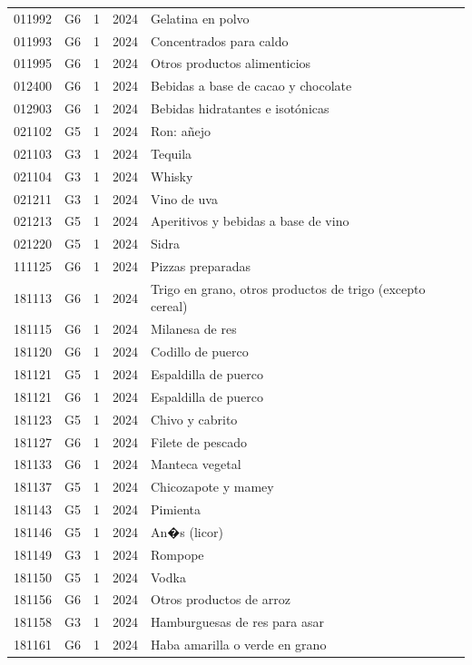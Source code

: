 \begin{table}[ht]
\begin{tabular}{llrll}
  011992 & G6 &   1 & 2024 & Gelatina en polvo \\ 
  011993 & G6 &   1 & 2024 & Concentrados para caldo \\ 
  011995 & G6 &   1 & 2024 & Otros productos alimenticios \\ 
  012400 & G6 &   1 & 2024 & Bebidas a base de cacao y chocolate \\ 
  012903 & G6 &   1 & 2024 & Bebidas hidratantes e isotónicas \\ 
  021102 & G5 &   1 & 2024 & Ron: añejo \\ 
  021103 & G3 &   1 & 2024 & Tequila \\ 
  021104 & G3 &   1 & 2024 & Whisky \\ 
  021211 & G3 &   1 & 2024 & Vino de uva \\ 
  021213 & G5 &   1 & 2024 & Aperitivos y bebidas a base de vino \\ 
  021220 & G5 &   1 & 2024 & Sidra \\ 
  111125 & G6 &   1 & 2024 & Pizzas preparadas \\ 
  181113 & G6 &   1 & 2024 & Trigo en grano, otros productos de trigo (excepto cereal) \\ 
  181115 & G6 &   1 & 2024 & Milanesa de res \\ 
  181120 & G6 &   1 & 2024 & Codillo de puerco \\ 
  181121 & G5 &   1 & 2024 & Espaldilla de puerco \\ 
  181121 & G6 &   1 & 2024 & Espaldilla de puerco \\ 
  181123 & G5 &   1 & 2024 & Chivo y cabrito \\ 
  181127 & G6 &   1 & 2024 & Filete de pescado \\ 
  181133 & G6 &   1 & 2024 & Manteca vegetal \\ 
  181137 & G5 &   1 & 2024 & Chicozapote y mamey \\ 
  181143 & G5 &   1 & 2024 & Pimienta \\ 
  181146 & G5 &   1 & 2024 & An�s (licor) \\ 
  181149 & G3 &   1 & 2024 & Rompope \\ 
  181150 & G5 &   1 & 2024 & Vodka \\ 
  181156 & G6 &   1 & 2024 & Otros productos de arroz \\ 
  181158 & G3 &   1 & 2024 & Hamburguesas de res para asar \\ 
  181161 & G6 &   1 & 2024 & Haba amarilla o verde en grano \\ 

\end{tabular}
\end{table}
